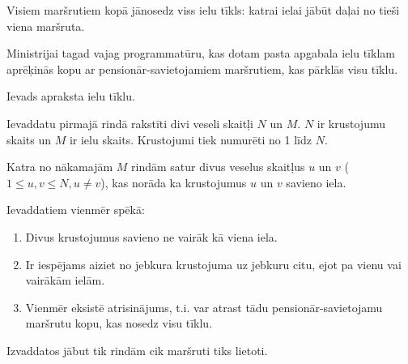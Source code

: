 \documentclass{boi2014-lv}
\begin{document}
		Visiem maršrutiem kopā jānosedz viss ielu tīkls: katrai ielai jābūt daļai no tieši viena maršruta.

    \Task
		
		Ministrijai tagad vajag programmatūru, kas dotam pasta apgabala ielu tīklam aprēķinās kopu ar pensionār-savietojamiem maršrutiem, kas pārklās visu tīklu.

    \Input

		Ievads apraksta ielu tīklu.
		
		Ievaddatu pirmajā rindā rakstīti divi veseli skaitļi $N$ un $M$. $N$ ir krustojumu skaits un $M$ ir ielu skaits. Krustojumi tiek numurēti no 1 līdz $N$.

		Katra no nākamajām $M$ rindām satur divus veselus skaitļus $u$ un $v$ ($1 \le u, v \le N, u \neq v$), kas norāda ka krustojumus $u$ un $v$ savieno iela.

		Ievaddatiem vienmēr spēkā:
    \begin{enumerate}
        \item Divus krustojumus savieno ne vairāk kā viena iela.
	\item Ir iespējams aiziet no jebkura krustojuma uz jebkuru citu, ejot pa vienu vai vairākām ielām. %
        \item Vienmēr eksistē atrisinājums, t.i. var atrast tādu pensionār-savietojamu maršrutu kopu, kas nosedz visu tīklu. %
	
    \end{enumerate}

    \Output
		Izvaddatos jābut tik rindām cik maršruti tiks lietoti.
		
\end{document}
